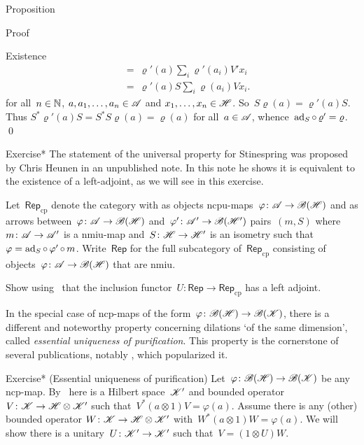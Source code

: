 \documentclass[b]{subfiles}
\begin{document}
\begin{parsec}
\begin{point}{Proposition}
\begin{point}{Proof}
\begin{point}{Existence}
\begin{align*}
    &\  =\ \varrho'(a) \sum_i \varrho'(a_i)V'x_i\\
    &\ =\ \varrho'(a) S \sum_i \varrho(a_i)V x_i.
\end{align*}
for all~$n \in \mathbb{N}$, $a, a_1, \ldots, a_n \in \mathscr{A}$ and
    $x_1, \ldots, x_n \in \mathscr{H}$.
So~$S \varrho(a) = \varrho'(a)S$.
Thus $S^* \varrho'(a) S = S^*S\varrho(a) = \varrho(a)$ for all~$a\in \mathscr{A}$,
whence~$\mathrm{ad}_S \mathop{\circ} \varrho' = \varrho$. \qed
\end{point}
\end{point}
\end{point}
\begin{point}{Exercise*}%
    The statement of the universal property
        for Stinespring
        was proposed by Chris Heunen in an unpublished note.
    In this note he shows it is equivalent to the existence
        of a left-adjoint, as we will see in this exercise.
    
    Let~$\mathsf{Rep}_{\mathrm{cp}}$
        denote the category with as objects
            ncpu-maps~$\varphi\colon \mathscr{A} \to \mathscr{B}(\mathscr{H})$
            and as arrows between~$\varphi\colon \mathscr{A} \to \mathscr{B}(\mathscr{H})$
            and~$\varphi'\colon \mathscr{A}' \to \mathscr{B}(\mathscr{H}')$
            pairs~$(m, S)$
            where~$m\colon \mathscr{A} \to \mathscr{A}'$ is a nmiu-map
            and~$S\colon \mathscr{H} \to \mathscr{H}'$ is an isometry
            such that~$\varphi = \mathrm{ad}_S \mathop{\circ} \varphi' \mathop{\circ} m$.
    Write~$\mathsf{Rep}$
        for the full subcategory of~$\mathsf{Rep}_{\mathrm{cp}}$
        consisting of objects~$\varphi\colon \mathscr{A} \to \mathscr{B}(\mathscr{H})$
            that are nmiu.

Show using~
    that the inclusion functor~$U \colon \mathsf{Rep}
    \to \mathsf{Rep}_{\mathrm{cp}}$ has a left adjoint.
\par %
\begin{point}%
In the special case of ncp-maps
    of the form~$\varphi \colon \mathscr{B}(\mathscr{H}) \to \mathscr{B}(\mathscr{K})$,
    there is a different and noteworthy  property
    concerning dilations `of the same dimension',
    called \emph{essential uniqueness of purification}.
This property is the cornerstone of several publications,
    notably \cite{chiribella}, which popularized it.
\par %
\end{point}
\end{point}
\begin{point}{Exercise* (Essential uniqueness of purification)}
    Let~$\varphi \colon \mathscr{B}(\mathscr{H}) \to \mathscr{B}(\mathscr{K})$
        be any ncp-map.
    By~
    here is a Hilbert space~$\mathscr{K}'$
        and bounded operator~$V\colon \mathscr{K} \to \mathscr{H} \otimes \mathscr{K}'$
        such that~$V^* (a\otimes 1) V = \varphi(a)$.
        Assume there is any (other) bounded operator
        $W\colon \mathscr{K} \to \mathscr{H} \otimes \mathscr{K}'$
        with~$W^* (a \otimes 1) W = \varphi(a)$.
    We will show there is a unitary~$U \colon \mathscr{K}' \to \mathscr{K}'$
    such that~$V = (1 \otimes U) W$.


\end{point}
\end{parsec}
\end{document}
